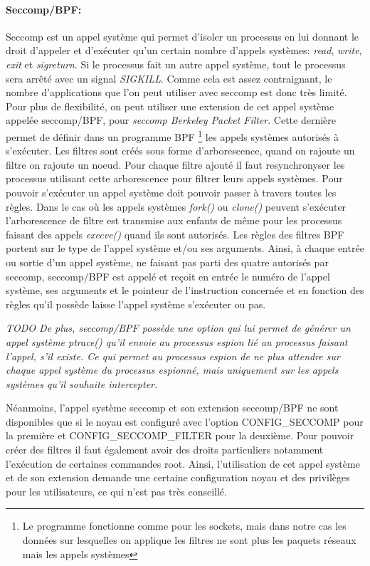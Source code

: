 \paragraph{Seccomp/BPF:}
Seccomp \cite{INTERCEPTION:seccomp_bpf} est un appel système qui permet d'isoler
un processus en lui donnant le droit d'appeler et d'exécuter qu'un certain
nombre d'appels systèmes: \textit{read}, \textit{write}, \textit{exit} et
\textit{sigreturn}. Si le processus fait un autre appel système, tout le
processus sera arrêté avec un signal \textit{SIGKILL}. Comme cela est assez
contraignant, le nombre d'applications que l'on peut utiliser avec seccomp est
donc très limité. Pour plus de flexibilité, on peut utiliser une extension de
cet appel système appelée seccomp/BPF, pour \textit{seccomp Berkeley Packet
  Filter}. Cette dernière permet de définir dans un programme BPF \footnote{Le
  programme fonctionne comme pour les sockets, mais dans notre cas les données
  sur lesquelles on applique les filtres ne sont plus les paquets réseaux mais
  les appels systèmes} \cite{INTERCEPTION:bpf} les appels systèmes autorisés à
s'exécuter. Les filtres sont créés sous forme d'arborescence, quand on rajoute
un filtre on rajoute un noeud. Pour chaque filtre ajouté il faut resynchronyser
les processus utilisant cette arborescence pour filtrer leurs appels
systèmes. Pour pouvoir s'exécuter un appel système doit pouvoir passer à travers
toutes les règles. Dans le cas où les appels systèmes \textit{fork()} ou
\textit{clone()} peuvent s'exécuter l'arborescence de filtre est transmise aux
enfants de même pour les processus faisant des appels \textit{execve()} quand
ils sont autorisés. Les règles des filtres BPF portent sur le type de l'appel
système et/ou ses arguments. Ainsi, à chaque entrée ou sortie d'un appel
système, ne faisant pas parti des quatre autorisés par seccomp, seccomp/BPF est
appelé et reçoit en entrée le numéro de l'appel système, ses arguments et le
pointeur de l'instruction concernée et en fonction des règles qu'il possède
laisse l'appel système s'exécuter ou pas.

\textit{{\color{red}TODO} De plus, seccomp/BPF possède une option qui lui permet de générer un appel
système ptrace() qu'il envoie au processus espion lié au processus faisant
l'appel, s'il existe. Ce qui permet au processus espion de ne plus attendre sur
chaque appel système du processus espionné, mais uniquement sur les appels
systèmes qu'il souhaite intercepter.}

Néanmoins, l'appel système seccomp et son extension seccomp/BPF ne sont
disponibles que si le noyau est configuré avec l'option CONFIG\_SECCOMP pour la
première et CONFIG\_SECCOMP\_FILTER pour la deuxième. Pour pouvoir créer des
filtres il faut également avoir des droits particuliers notamment l'exécution de
certaines commandes root. Ainsi, l'utilisation de cet appel système et de son
extension demande une certaine configuration noyau et des privilèges pour les
utilisateurs, ce qui n'est pas très conseillé.

